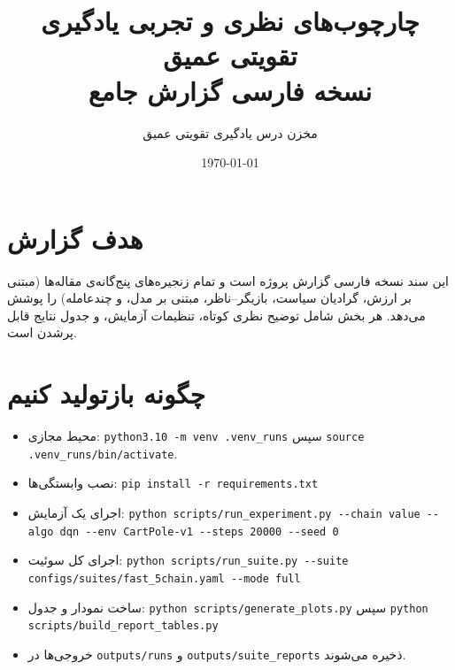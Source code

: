 \documentclass[12pt]{article}
\title{چارچوب‌های نظری و تجربی یادگیری تقویتی عمیق \\ نسخه فارسی گزارش جامع}
\author{مخزن درس یادگیری تقویتی عمیق}
\date{\today}
\begin{document}
\maketitle
\tableofcontents

\section{هدف گزارش}
این سند نسخه فارسی گزارش پروژه است و تمام زنجیره‌های پنج‌گانه‌ی مقاله‌ها (مبتنی بر ارزش، گرادیان سیاست، بازیگر--ناظر، مبتنی بر مدل، و چندعامله) را پوشش می‌دهد. هر بخش شامل توضیح نظری کوتاه، تنظیمات آزمایش، و جدول نتایج قابل پرشدن است.

\section{چگونه بازتولید کنیم}
\begin{itemize}[leftmargin=*]
    \item محیط مجازی: \verb|python3.10 -m venv .venv_runs| سپس \verb|source .venv_runs/bin/activate|.
    \item نصب وابستگی‌ها: \verb|pip install -r requirements.txt|
    \item اجرای یک آزمایش: \verb|python scripts/run_experiment.py --chain value --algo dqn --env CartPole-v1 --steps 20000 --seed 0|
    \item اجرای کل سوئیت: \verb|python scripts/run_suite.py --suite configs/suites/fast_5chain.yaml --mode full|
    \item ساخت نمودار و جدول: \verb|python scripts/generate_plots.py| سپس \verb|python scripts/build_report_tables.py|
    \item خروجی‌ها در \verb|outputs/runs| و \verb|outputs/suite_reports| ذخیره می‌شوند.
\end{itemize}
\end{document}
